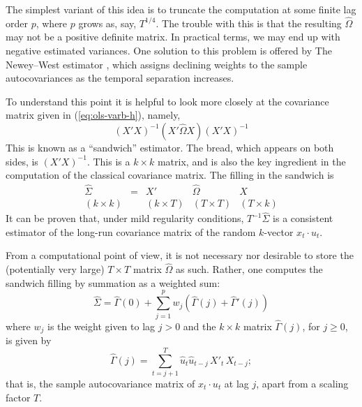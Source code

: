 The simplest variant of this idea is to truncate the computation at
some finite lag order $p$, where $p$ grows as, say, $T^{1/4}$.  The
trouble with this is that the resulting $\hat{\Omega}$ may not be a
positive definite matrix.  In practical terms, we may end up with
negative estimated variances.  One solution to this problem is offered
by The Newey--West estimator \citep{newey-west87}, which assigns
declining weights to the sample autocovariances as the temporal
separation increases.

To understand this point it is helpful to look more closely at the
covariance matrix given in (\ref{eq:ols-varb-h}), namely,
%
\[
(X'X)^{-1} (X' \hat{\Omega} X) (X'X)^{-1}
\]
%
This is known as a ``sandwich'' estimator.  The bread, which appears
on both sides, is $(X'X)^{-1}$.  This is a $k \times k$ matrix, and is
also the key ingredient in the computation of the classical covariance
matrix.  The filling in the sandwich is
%
\[
\begin{array}{ccccc}
\hat{\Sigma} & = & X' & \hat{\Omega} & X \\
{\scriptstyle (k \times k)} & &
{\scriptstyle (k \times T)} & {\scriptstyle (T \times T)} & 
  {\scriptstyle (T \times k)}
\end{array}
\]
%
It can be proven that, under mild regularity conditions, $T^{-1}
\hat{\Sigma}$ is a consistent estimator of the long-run covariance
matrix of the random $k$-vector $x_t \cdot u_t$.   

From a computational point of view, it is not necessary nor desirable
to store the (potentially very large) $T \times T$ matrix
$\hat{\Omega}$ as such.  Rather, one computes the sandwich filling by
summation as a weighted sum:
%
\[
\hat{\Sigma} = \hat{\Gamma}(0) + \sum_{j=1}^p w_j 
  \left(\hat{\Gamma}(j) + \hat{\Gamma}'(j) \right)
\]
%
where $w_j$ is the weight given to lag $j > 0$ and the $k \times k$
matrix $\hat{\Gamma}(j)$, for $j \geq 0$, is given by
\[
  \hat{\Gamma}(j) = \sum_{t=j+1}^T \hat{u}_t \hat{u}_{t-j}\, X'_t\,
  X_{t-j} ;
\]
that is, the sample autocovariance matrix of $x_t \cdot u_t$ at lag
$j$, apart from a scaling factor $T$.

